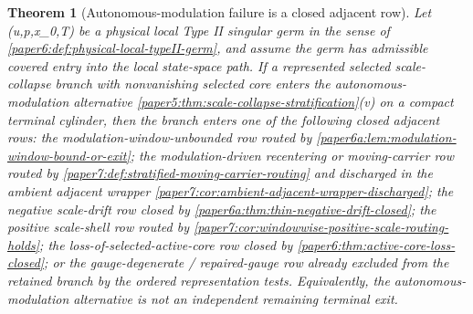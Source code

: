 \documentclass[11pt]{amsart}
\def\({}%
\def\){}%
\theoremstyle{plain}
\newtheorem{theorem}{Theorem}[section]
\theoremstyle{definition}
\theoremstyle{remark}
\begin{document}
\begin{theorem}[Autonomous-modulation failure is a closed adjacent row]
\label{paper6:thm:autonomous-modulation-failure-closed}
Let \((u,p,x_0,T)\) be a physical local Type II singular germ in the sense
of \cref{paper6:def:physical-local-typeII-germ}, and assume the germ has
admissible covered entry into the local state-space path.  If a represented
selected scale-collapse branch with nonvanishing selected core enters the
autonomous-modulation alternative
\cref{paper5:thm:scale-collapse-stratification}\textup{(v)} on a compact
terminal cylinder, then the branch enters one of the following closed
adjacent rows: the modulation-window-unbounded row routed by
\cref{paper6a:lem:modulation-window-bound-or-exit}; the modulation-driven
recentering or moving-carrier row routed by
\cref{paper7:def:stratified-moving-carrier-routing} and discharged in the
ambient adjacent wrapper
\cref{paper7:cor:ambient-adjacent-wrapper-discharged}; the negative
scale-drift row closed by
\cref{paper6a:thm:thin-negative-drift-closed}; the positive scale-shell row
routed by \cref{paper7:cor:windowwise-positive-scale-routing-holds}; the
loss-of-selected-active-core row closed by
\cref{paper6:thm:active-core-loss-closed}; or the gauge-degenerate /
repaired-gauge row already excluded from the retained branch by the ordered
representation tests.  Equivalently, the
autonomous-modulation alternative is not an independent remaining terminal
exit.
\end{theorem}
\end{document}
